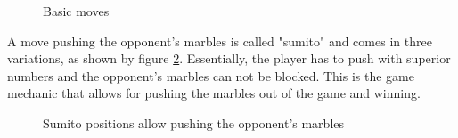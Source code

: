 \documentclass{../lib/llncs}
\begin{document}
\begin{figure}[!h]
	\centering
	\hfill
	\hfill
	\caption{Basic moves \cite{abalone_sa_abalone_nodate}}
	\label{basics}
\end{figure}
A move pushing the opponent's marbles is called "sumito" and comes in three variations, as shown by figure \ref{sumito}. Essentially, the player has to push with superior numbers and the opponent's marbles can not be blocked. This is the game mechanic that allows for pushing the marbles out of the game and winning.

\begin{figure}[!h]
	\centering
	\hfill
	\hfill
	\caption{Sumito positions allow pushing the opponent's marbles \cite{abalone_sa_abalone_nodate}}
	\label{sumito}
\end{figure}
\end{document}

